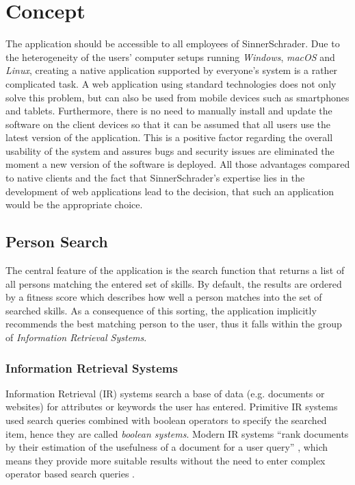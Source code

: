 \chapter{Concept}
The application should be accessible to all employees of SinnerSchrader. Due to the heterogeneity of the users' computer setups running \textit{Windows}, \textit{macOS} and \textit{Linux}, creating a native application supported by everyone’s system is a rather complicated task. A web application using standard technologies does not only solve this problem, but can also be used from mobile devices such as smartphones and tablets. Furthermore, there is no need to manually install and update the software on the client devices so that it can be assumed that all users use the latest version of the application. This is a positive factor regarding the overall usability of the system and assures bugs and security issues are eliminated the moment a new version of the software is deployed. All those advantages compared to native clients and the fact that SinnerSchrader’s expertise lies in the development of web applications lead to the decision, that such an application would be the appropriate choice.

\section{Person Search}
The central feature of the application is the search function that returns a list of all persons matching the entered set of skills. By default, the results are ordered by a fitness score which describes how well a person matches into the set of searched skills. As a consequence of this sorting, the application implicitly recommends the best matching person to the user, thus it falls within the group of \textit{Information Retrieval Systems}.

\subsection{Information Retrieval Systems}
Information Retrieval (IR) systems search a base of data (e.g. documents or websites) for attributes or keywords the user has entered.
Primitive IR systems used search queries combined with boolean operators to specify the searched item, hence they are called \textit{boolean systems}.
Modern IR systems ``rank documents by their estimation of the usefulness of a document for a user query'' \cite{IR}, which means they provide more suitable results without the need to enter complex operator based search queries \cite{IR}.


